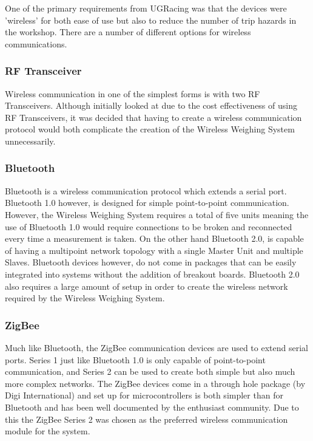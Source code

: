 One of the primary requirements from UGRacing was that the devices were 'wireless' for both ease of use but also to reduce the number of trip hazards in the workshop. There are a number of different options for wireless communications.
\subsubsection{RF Transceiver}
Wireless communication in one of the simplest forms is with two RF Transceivers. Although initially looked at due to the cost effectiveness of using RF Transceivers, it was decided that having to create a wireless communication protocol would both complicate the creation of the Wireless Weighing System unnecessarily.
\subsubsection{Bluetooth}
Bluetooth is a wireless communication protocol which extends a serial port. Bluetooth 1.0 however, is designed for simple point-to-point communication. However, the Wireless Weighing System requires a total of five units meaning the use of Bluetooth 1.0 would require connections to be broken and reconnected every time a measurement is taken. On the other hand Bluetooth 2.0, is capable of having a multipoint network topology with a single Master Unit and multiple Slaves. Bluetooth devices however, do not come in packages that can be easily integrated into systems without the addition of breakout boards. Bluetooth 2.0 also requires a large amount of setup in order to create the wireless network required by the Wireless Weighing System.
\subsubsection{ZigBee}
Much like Bluetooth, the ZigBee communication devices are used to extend serial ports. Series 1 just like Bluetooth 1.0 is only capable of point-to-point communication, and Series 2 can be used to create both simple but also much more complex networks. The ZigBee devices come in a through hole package (by Digi International) and set up for microcontrollers is both simpler than for Bluetooth and has been well documented by the enthusiast community. Due to this the ZigBee Series 2 was chosen as the preferred wireless communication module for the system.
